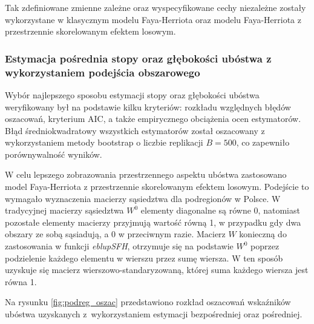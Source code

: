 Tak zdefiniowane zmienne zależne oraz wyspecyfikowane cechy niezależne zostały wykorzystane w klasycznym modelu Faya-Herriota oraz modelu Faya-Herriota z przestrzennie skorelowanym efektem losowym.

\subsubsection{Estymacja pośrednia stopy oraz głębokości ubóstwa z wykorzystaniem podejścia obszarowego}

Wybór najlepszego sposobu estymacji stopy oraz głębokości ubóstwa weryfikowany był na podstawie kilku kryteriów: rozkładu względnych błędów oszacowań, kryterium AIC, a także empirycznego obciążenia ocen estymatorów. Błąd średniokwadratowy wszystkich estymatorów został oszacowany z wykorzystaniem metody bootstrap o liczbie replikacji $B=500$, co zapewniło porównywalność wyników.

W celu lepszego zobrazowania przestrzennego aspektu ubóstwa zastosowano model Faya-Herriota z przestrzennie skorelowanym efektem losowym. Podejście to wymagało wyznaczenia macierzy sąsiedztwa dla podregionów w Polsce. W tradycyjnej macierzy sąsiedztwa $W^0$ elementy diagonalne są równe 0, natomiast pozostałe elementy macierzy przyjmują wartość równą 1, w przypadku gdy dwa obszary ze sobą sąsiadują, a 0 w przeciwnym razie. Macierz $W$ konieczną do zastosowania w funkcji \emph{eblupSFH}, otrzymuje się na podstawie $W^0$ poprzez podzielenie każdego elementu w wierszu przez sumę wiersza. W ten sposób uzyskuje się macierz wierszowo-standaryzowaną, której suma każdego wiersza jest równa 1.

Na rysunku \ref{fig:podreg_oszac} przedstawiono rozkład oszacowań wskaźników ubóstwa uzyskanych z~wykorzystaniem estymacji bezpośredniej oraz pośredniej.

